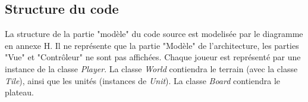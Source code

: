 \subsection{Structure du code}

La structure de la partie "modèle" du code source est modelisée par le diagramme en annexe H. Il ne représente que la partie "Modèle" de l'architecture, les parties "Vue" et "Contrôleur" ne sont pas affichées.
Chaque joueur est représenté par une instance de la classe \emph{Player}.
La classe \emph{World} contiendra le terrain (avec la classe \emph{Tile}), ainsi que les unités (instances de \emph{Unit}).
La classe \emph{Board} contiendra le plateau.

